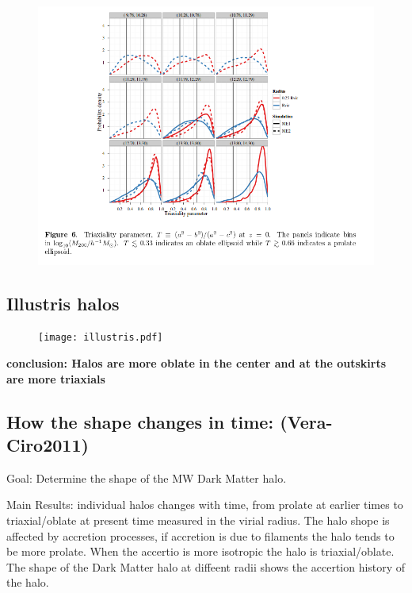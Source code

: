 \documentclass[12pt]{article}
\begin{document}
\begin{figure}[H]
\centering
\includegraphics[scale=0.5]{triaxial.png}
\end{figure}


\subsection{Illustris halos}

\begin{figure}[H]
\texttt{[image: illustris.pdf]}
\end{figure}

\textbf{conclusion: Halos are more oblate in the center and at the outskirts are more triaxials}


\subsection{How the shape changes in time: (Vera-Ciro2011)}

Goal:  Determine the shape of the MW Dark Matter halo.

Main Results: individual halos changes with time, from prolate at earlier times 
to triaxial/oblate at present time measured in the virial radius. The halo 
shope is affected by accretion processes, if accretion is due to filaments
the halo tends to be more prolate. When the accertio is more isotropic the halo
is triaxial/oblate. The shape of the Dark Matter halo at diffeent radii shows 
the accertion history of the halo.    
\end{document}

